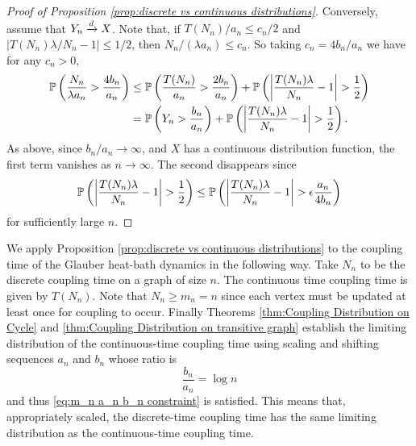 \begin{proof}[Proof of Proposition \ref{prop:discrete vs continuous distributions}]
		Conversely, assume that $Y_n \xrightarrow{d} X$. Note that, if $T(N_n)/a_n \leq c_n/2$ and $|T(N_n) \lambda / N_n - 1| \leq 1/2$, then $N_n / (\lambda a_n )\leq c_n$. So taking $c_n = 4b_n/a_n$ we have for any $c_n > 0$,
		\begin{align}
			\mathbb{P}\left(\frac{N_n}{\lambda a_n} > \frac{4 b_n}{a_n} \right) &\leq \mathbb{P}\left(\frac{T(N_n)}{a_n} > \frac{2 b_n}{a_n}\right) + \mathbb{P}\left(\left|\frac{T(N_n)\lambda}{N_n} - 1\right| > \frac{1}{2}\right)\\
			&= \mathbb{P}\left(Y_n > \frac{b_n}{a_n}\right) + \mathbb{P}\left(\left|\frac{T(N_n)\lambda}{N_n} - 1\right| > \frac{1}{2}\right).
		\end{align}
		As above, since $b_n/a_n \rightarrow \infty$, and $X$ has a continuous distribution function, 
		the first term vanishes as $n \rightarrow \infty$. The second disappears since 
		\begin{equation}
			\mathbb{P}\left(\left|\frac{T(N_n)\lambda}{N_n} - 1\right| > \frac{1}{2}\right) \leq \mathbb{P}\left(\left|\frac{T(N_n)\lambda}{N_n} - 1\right| > \epsilon\frac{a_n}{4 b_n} \right)
		\end{equation}
		for sufficiently large $n$.
	\end{proof}


	\begin{remark}
		We apply Proposition \ref{prop:discrete vs continuous distributions} to the coupling time of the Glauber heat-bath dynamics in the following way. Take $N_n$ to be the discrete coupling time on a graph of size $n$. The continuous time coupling time is given by $T(N_n)$. Note that $N_n \geq m_n = n$ since each vertex must be updated at least once for coupling to occur. Finally Theorems \ref{thm:Coupling Distribution on Cycle} and \ref{thm:Coupling Distribution on transitive graph} establish the limiting distribution of the continuous-time coupling time using scaling and shifting sequences $a_n$ and $b_n$ whose ratio is 
		\begin{equation}
			\frac{b_n}{a_n} = \log n
		\end{equation}
		and thus \eqref{eq:m_n a_n b_n constraint} is satisfied. This means that, appropriately scaled, the discrete-time coupling time has the same limiting distribution as the continuous-time coupling time.
	\end{remark}

